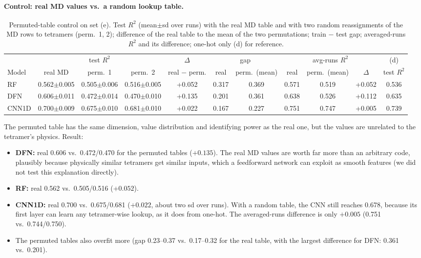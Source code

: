 \paragraph{Control: real MD values vs.\ a random lookup table.}
\begin{table}[H]\centering\scriptsize\setlength{\tabcolsep}{2.4pt}
\caption{Permuted-table control on set (e). Test $R^2$ (mean$\pm$sd over runs) with the real MD table and with two random reassignments of the MD rows to tetramers (perm.\ 1, 2); difference of the real table to the mean of the two permutations; train $-$ test gap; averaged-runs $R^2$ and its difference; one-hot only (d) for reference.}
\begin{tabular}{l|ccc|c|cc|ccc|c}\toprule
& \multicolumn{3}{c|}{test $R^2$} & $\Delta$ & \multicolumn{2}{c|}{gap} & \multicolumn{3}{c|}{avg-runs $R^2$} & (d) \\
Model & real MD & perm.\ 1 & perm.\ 2 & real $-$ perm. & real & perm.\ (mean) & real & perm.\ (mean) & $\Delta$ & test $R^2$\\\midrule
RF & 0.562$\pm$0.005 & 0.505$\pm$0.006 & 0.516$\pm$0.005 & +0.052 & 0.317 & 0.369 & 0.571 & 0.519 & +0.052 & 0.536 \\
DFN & 0.606$\pm$0.011 & 0.472$\pm$0.014 & 0.470$\pm$0.010 & +0.135 & 0.201 & 0.361 & 0.638 & 0.526 & +0.112 & 0.635 \\
CNN1D & 0.700$\pm$0.009 & 0.675$\pm$0.010 & 0.681$\pm$0.010 & +0.022 & 0.167 & 0.227 & 0.751 & 0.747 & +0.005 & 0.739 \\
\bottomrule\end{tabular}\label{tab:perm}\end{table}
The permuted table has the same dimension, value distribution and identifying power as the real one, but the values are unrelated to the tetramer's physics. Result:
\begin{itemize}
\item \textbf{DFN:} real 0.606 vs.\ 0.472/0.470 for the permuted tables ($+0.135$). The real MD values are worth far more than an arbitrary code, plausibly because physically similar tetramers get similar inputs, which a feedforward network can exploit as smooth features (we did not test this explanation directly).
\item \textbf{RF:} real 0.562 vs.\ 0.505/0.516 ($+0.052$).
\item \textbf{CNN1D:} real 0.700 vs.\ 0.675/0.681 ($+0.022$, about two sd over runs). With a random table, the CNN still reaches 0.678, because its first layer can learn any tetramer-wise lookup, as it does from one-hot. The averaged-runs difference is only $+0.005$ (0.751 vs.\ 0.744/0.750).
\item The permuted tables also overfit more (gap 0.23--0.37 vs.\ 0.17--0.32 for the real table, with the largest difference for DFN: 0.361 vs.\ 0.201).
\end{itemize}

